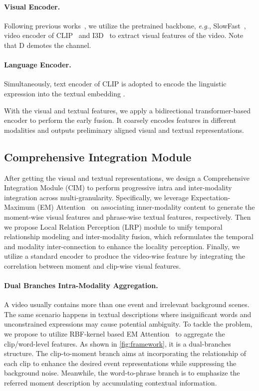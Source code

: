 \documentclass[10pt,twocolumn,letterpaper]{article}
\begin{document}
\paragraph{Visual Encoder.} Following previous works~\cite{momentdetr,umt,qddetr,univtg}, we utilize the pretrained backbone, \textit{e.g.}, SlowFast~\cite{slowfast}, video encoder of CLIP~\cite{clip} and I3D~\cite{i3d} to extract visual features  of the video. Note that D demotes the channel.
\vspace{-12pt}
\paragraph{Language Encoder.} Simultaneously, text encoder of CLIP is adopted to encode the linguistic expression into the textual embedding .
 
With the visual and textual features, we apply a bidirectional transformer-based encoder to perform the early fusion.
It coarsely encodes features in different modalities and outputs preliminary aligned visual and textual representations.  

\subsection{Comprehensive Integration Module}
\label{sec:cim}
After getting the visual and textual representations, we design a Comprehensive Integration Module (CIM) to perform progressive intra and inter-modality integration across multi-granularity. 
Specifically, we leverage Expectation-Maximum (EM) Attention~\cite{em} on associating inner-modality content to generate the moment-wise visual features and phrase-wise textual features, respectively. 
Then we propose Local Relation Perception (LRP) module to unify temporal relationship modeling and inter-modality fusion, which reformulates the temporal and modality inter-connection to enhance the locality perception.
Finally, we utilize a standard encoder to produce the video-wise feature by integrating the correlation between moment and clip-wise visual features.
\vspace{-10pt}
\paragraph{Dual Branches Intra-Modality Aggregation.} A video usually contains more than one event and irrelevant background scenes.
The same scenario happens in textual descriptions where insignificant words and unconstrained expressions may cause potential ambiguity. 
To tackle the problem, we propose to utilize RBF-kernel based EM Attention~\cite{em,rskp} to aggregate the clip/word-level features. 
As shown in \cref{fig:framework}, it is a dual-branches structure.
The clip-to-moment branch aims at incorporating the relationship of each clip to enhance the desired event representations while suppressing the background noise.
Meanwhile, the word-to-phrase branch is to emphasize the referred moment description by accumulating contextual information.
\end{document}
